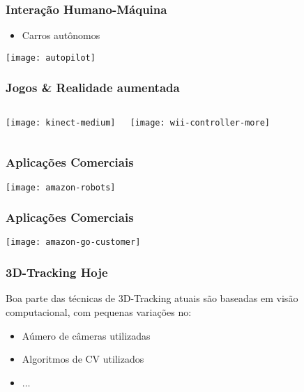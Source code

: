\begin{frame}
  \frametitle{Interação Humano-Máquina}
  \begin{itemize}
    \item  Carros autônomos
  \end{itemize}

  \begin{center}
    \texttt{[image: autopilot]}
  \end{center}
\end{frame}

\begin{frame}
    \frametitle{Jogos \& Realidade aumentada}
    \begin{columns}[T,onlytextwidth]
        \begin{center}
            \texttt{[image: kinect-medium]}
        \end{center}

        \begin{center}
            \texttt{[image: wii-controller-more]}
        \end{center}
    \end{columns}
\end{frame}

\begin{frame}
    \frametitle{Aplicações Comerciais}
        \begin{center}
            \texttt{[image: amazon-robots]}
        \end{center}
\end{frame}

\begin{frame}
    \frametitle{Aplicações Comerciais}
        \begin{center}
            \texttt{[image: amazon-go-customer]}
        \end{center}
\end{frame}

\begin{frame}
  \frametitle{3D-Tracking Hoje}

  Boa parte das técnicas de 3D-Tracking atuais são baseadas em visão
  computacional, com pequenas variações no:

  \begin{itemize}
    \item Aúmero de câmeras utilizadas
    \item Algoritmos de CV utilizados
    \item $\dots$
  \end{itemize}
\end{frame}

